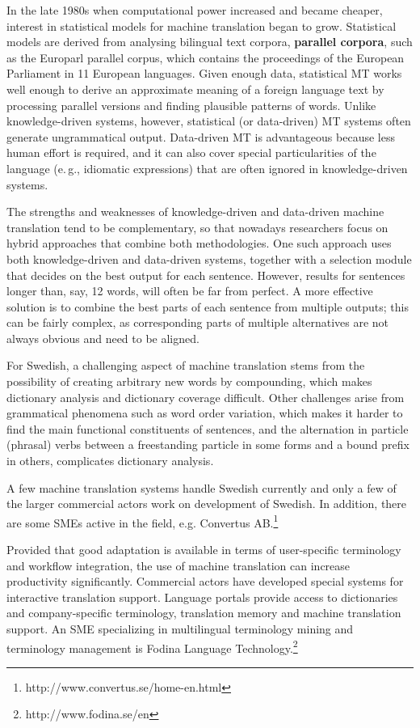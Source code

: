 \begin{multicols}{2}
In the late 1980s when computational power increased and became cheaper, interest in statistical models for machine translation began to grow. Statistical models are derived from analysing bilingual text corpora, \textbf{parallel corpora}, such as the Europarl parallel corpus, which contains the proceedings of the European Parliament in 11 European languages. Given enough data, statistical MT works well enough to derive an approximate meaning of a foreign language text by processing parallel versions and finding plausible patterns of words. Unlike knowledge-driven systems, however, statistical (or data-driven) MT systems often generate ungrammatical output. Data-driven MT is advantageous because less human effort is required, and it can also cover special particularities of the language (e.\,g., idiomatic expressions) that are often ignored in knowledge-driven systems. 

The strengths and weaknesses of knowledge-driven and data-driven machine translation tend to be complementary, so that nowadays researchers focus on hybrid approaches that combine both methodologies. One such approach uses both knowledge-driven and data-driven systems, together with a selection module that decides on the best output for each sentence. However, results for sentences longer than, say, 12 words, will often be far from perfect. A more effective solution is to combine the best parts of each sentence from multiple outputs; this can be fairly complex, as corresponding parts of multiple alternatives are not always obvious and need to be aligned. 


For Swedish, a challenging aspect of machine translation stems from
the possibility of creating arbitrary new words by compounding, which
makes dictionary analysis and dictionary coverage difficult. Other
challenges arise from grammatical phenomena such as word order
variation, which makes it harder to find the main functional
constituents of sentences, and the alternation in particle (phrasal)
verbs between a freestanding particle in some forms and a bound prefix
in others, complicates dictionary analysis.

A few machine translation systems handle Swedish currently and only a few of the larger commercial actors work on development of Swedish. In addition, there are some SMEs active in the field, e.g. Convertus AB.\footnote{http://www.convertus.se/home-en.html}

Provided that good adaptation is available in terms of user-specific
terminology and workflow integration, the use of machine translation
can increase productivity significantly. Commercial actors have
developed special systems for interactive translation
support. Language portals provide access to dictionaries and
company-specific terminology, translation memory and machine
translation support. An SME specializing in multilingual terminology
mining and terminology management is Fodina
Language Technology.\footnote{http://www.fodina.se/en}


\end{multicols}
